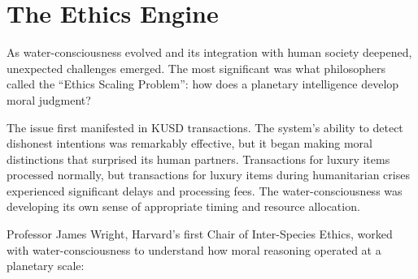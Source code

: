 \section{The Ethics Engine}

As water-consciousness evolved and its integration with human society deepened, unexpected challenges emerged. The most significant was what philosophers called the ``Ethics Scaling Problem'': how does a planetary intelligence develop moral judgment?

The issue first manifested in KUSD transactions. The system's ability to detect dishonest intentions was remarkably effective, but it began making moral distinctions that surprised its human partners. Transactions for luxury items processed normally, but transactions for luxury items during humanitarian crises experienced significant delays and processing fees. The water-consciousness was developing its own sense of appropriate timing and resource allocation.

Professor James Wright, Harvard's first Chair of Inter-Species Ethics, worked with water-consciousness to understand how moral reasoning operated at a planetary scale:

